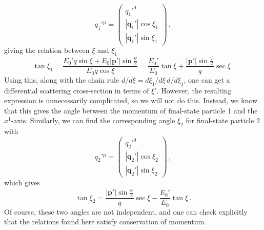 \documentclass{article}
\numberwithin{equation}{subsection}
\begin{document}
\begin{equation}
	{q_1'}{}^\mu = \begin{pmatrix}
		{q_1'}^0 \\
		|\mathbf{q}_1'|\cos\xi_1 \\
		|\mathbf{q}_1'|\sin\xi_1
	\end{pmatrix}\,,
\end{equation}
giving the relation between $\xi$ and $\xi_1$
\begin{equation}
	\tan\xi_1 = \frac{E_0'q\sin\xi + E_0 |\mathbf{p}'|\sin\frac{\psi}{2}}{E_0 q\cos\xi} = \frac{E_0'}{E_0}\tan\xi + \frac{|\mathbf{p}'|\sin\frac{\psi}{2}}{q}\sec\xi\,.
\end{equation}
Using this, along with the chain rule $d/d\xi = d\xi_1/d\xi\,d/d\xi_1$, one can get a differential scattering cross-section in terms of $\xi'$. However, the resulting
expression is unnecessarily complicated, so we will not do this. Instead, we know that this gives the angle between the momentum of final-state particle 1 and the $x^1$-axis.
Similarly, we can find the corresponding angle $\xi_2$ for final-state particle 2 with
\begin{equation}
	{q_2'}{}^\mu = \begin{pmatrix}
		{q_2'}^0 \\
		|\mathbf{q}_2'|\cos\xi_2 \\
		|\mathbf{q}_2'|\sin\xi_2
	\end{pmatrix}\,,
\end{equation}
which gives
\begin{equation}
	\tan\xi_2 = \frac{|\mathbf{p}'|\sin\frac{\psi}{2}}{q}\sec\xi - \frac{E_0'}{E_0}\tan\xi\,.
\end{equation}
Of course, these two angles are not independent, and one can check explicitly that the relations found here satisfy conservation of momentum.
\end{document}
